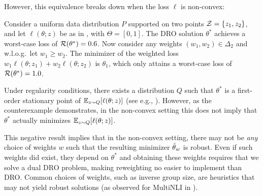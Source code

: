 However, this equivalence breaks down when the loss $\ell$ is non-convex:

\begin{counterexample}
Consider a uniform data distribution $P$ supported on two points $\mathcal{Z} = \{z_1, z_2\}$,
and let $\ell(\theta; z)$ be as in ,
with $\Theta = [0, 1]$.
The DRO solution $\theta^*$ achieves a worst-case loss of $\mathcal{R}(\theta^*)=0.6$.
Now consider any weights $(w_1, w_2) \in \Delta_2$ and w.l.o.g.\ let $w_1 \geq w_2$.
The minimizer of the weighted loss
$w_1 \ell(\theta; z_1) + w_2 \ell(\theta; z_2)$
is $\theta_1$, which only attains a worst-case loss of $\mathcal{R}(\theta^*)=1.0$.
\end{counterexample}

\begin{remark}
  Under regularity conditions, there exists a distribution $Q$ such that $\theta^*$ is a first-order stationary point of $\mathbb{E}_{z \sim Q} [\ell(\theta;z)]$ (see e.g., \citet{arjovsky2019invariant}).
  However, as the counterexample demonstrates, in the non-convex setting this does not imply that $\theta^*$ actually minimizes $\mathbb{E}_{z \sim Q} [\ell(\theta;z)]$.
\end{remark}

This negative result implies that in the non-convex setting,
there may not be \emph{any} choice of weights $w$
such that the resulting minimizer ${\hat\theta_{w}}$ is robust.
Even if such weights did exist, they depend on $\theta^*$ and obtaining these weights requires that we solve a dual DRO problem, making reweighting no easier to implement than DRO.
Common choices of weights, such as inverse group size, are heuristics that may not yield robust solutions (as observed for MultiNLI in ).
